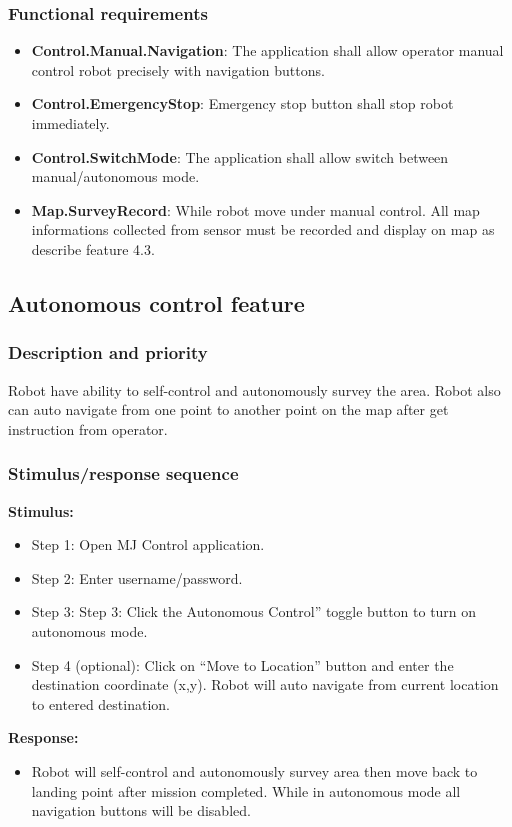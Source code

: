 \documentclass[10pt,a4paper,titlepage]{article}
\begin{document}
	\subsubsection{Functional requirements}
	\begin{itemize}
		\item \textbf{Control.Manual.Navigation}: The application shall allow operator manual control robot precisely with navigation buttons.
		\item \textbf{Control.EmergencyStop}: Emergency stop button shall stop robot immediately.
		\item \textbf{Control.SwitchMode}: The application shall allow switch between manual/autonomous mode.
		\item \textbf{Map.SurveyRecord}: While robot move under manual control. All map informations collected from sensor must be recorded and display on map as describe feature 4.3.
	\end{itemize}
	
	
	\subsection{Autonomous control feature }
	\subsubsection{Description and priority}
	\text Robot have ability to self-control and autonomously survey the area. Robot also can auto navigate from one point to another point on the map after get instruction from operator.
	\subsubsection{Stimulus/response sequence}
	\textbf{Stimulus:}
	\begin{itemize}
		\item Step 1: Open MJ Control application.
		\item Step 2: Enter username/password.
		\item Step 3: Step 3: Click the Autonomous Control” toggle button to turn on autonomous mode.
		\item Step 4 (optional): Click on “Move to Location” button and enter the destination coordinate (x,y). Robot will auto navigate from current location to entered destination.
	\end{itemize}
	\textbf{Response:}
	\begin{itemize}
		\item Robot will self-control and autonomously survey area then move back to landing point after mission completed. While in autonomous mode all navigation buttons will be disabled.
	\end{itemize}
\end{document}
